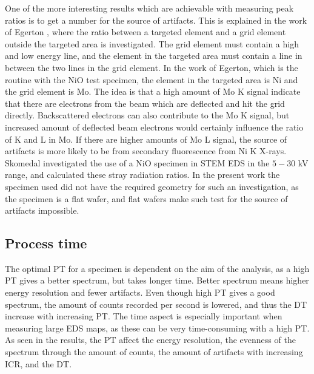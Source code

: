 One of the more interesting results which are achievable with measuring peak ratios is to get a number for the source of artifacts.
This is explained in the work of Egerton \cite{egerton_nio_characterization_1994}, where the ratio between a targeted element and a grid element outside the targeted area is investigated.
The grid element must contain a high and low energy line, and the element in the targeted area must contain a line in between the two lines in the grid element.
In the work of Egerton, which is the routine with the NiO test specimen, the element in the targeted area is Ni and the grid element is Mo.
The idea is that a high amount of Mo K signal indicate that there are electrons from the beam which are deflected and hit the grid directly.
Backscattered electrons can also contribute to the Mo K signal, but increased amount of deflected beam electrons would certainly influence the ratio of K and L in Mo.
If there are higher amounts of Mo L signal, the source of artifacts is more likely to be from secondary fluorescence from Ni K X-rays.
Skomedal \cite{skomedal_improving_2022} investigated the use of a NiO specimen in STEM EDS in the $5-30$ kV range, and calculated these stray radiation ratios.
In the present work the specimen used did not have the required geometry for such an investigation, as the specimen is a flat wafer, and flat wafers make such test for the source of artifacts impossible.









\subsection{Process time}
\label{discussion:process_time}

The optimal PT for a specimen is dependent on the aim of the analysis, as a high PT gives a better spectrum, but takes longer time.
Better spectrum means higher energy resolution and fewer artifacts.
Even though high PT gives a good spectrum, the amount of counts recorded per second is lowered, and thus the DT increase with increasing PT.
The time aspect is especially important when measuring large EDS maps, as these can be very time-consuming with a high PT.
As seen in the results, the PT affect the energy resolution, the evenness of the spectrum through the amount of counts, the amount of artifacts with increasing ICR, and the DT.


